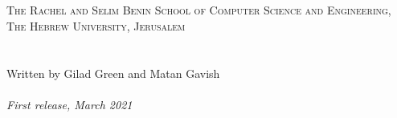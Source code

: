 \documentclass[11pt]{book} %
\begin{document}

\newpage
~\vfill
\thispagestyle{empty}
\textsc{\\\\ The Rachel and Selim Benin School of Computer Science and Engineering, The Hebrew University, Jerusalem}\\\\\\
Written by Gilad Green and Matan Gavish\\\\
\textit{First release, March 2021} %


\pagestyle{empty} %
\tableofcontents %
\cleardoublepage %
\pagestyle{fancy} %




%
%
%
%    
%
%
%


\newpage
\end{document}
